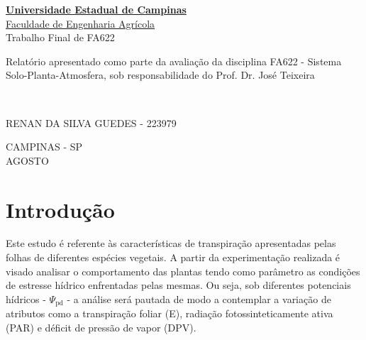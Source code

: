 \documentclass[a4paper, 12pt]{article}
\numberwithin{equation}{section}
\begin{document}
	\begin{titlepage}
		\begin{center}
			\textbf{\href{https://www.unicamp.br/unicamp/}{Universidade Estadual de Campinas}}\\\vspace{1cm}
			\href{https://www.feagri.unicamp.br/portal/}{Faculdade de Engenharia Agrícola}\\\vspace{5cm}
			\large{Trabalho Final de FA622}\\\vspace{4cm}
		\end{center}
		
		\hspace{8cm}\parbox{7cm}{Relatório apresentado como parte da avaliação da disciplina FA622 - Sistema Solo-Planta-Atmosfera, sob responsabilidade do Prof. Dr. José Teixeira}\\\vspace{4cm}
		
		RENAN DA SILVA GUEDES - 223979\\\vspace{4cm}
		\begin{center}
			CAMPINAS - SP\\\vspace{.2cm}
			AGOSTO
		\end{center}
		
	\end{titlepage}

	\newpage
	
	\tableofcontents
	\listoffigures
	
	\newpage
	
	\section{Introdução}
	 
	Este estudo é referente às características de transpiração apresentadas pelas folhas de diferentes espécies vegetais. A partir da experimentação realizada é visado analisar o comportamento das plantas tendo como parâmetro as condições de estresse hídrico enfrentadas pelas mesmas. Ou seja, sob diferentes potenciais hídricos - $\Psi_{\textrm{pd}}$ - a análise será pautada de modo a contemplar a variação de atributos como a transpiração foliar (E), radiação fotossinteticamente ativa (PAR) e déficit de pressão de vapor (DPV).
	
\end{document}
